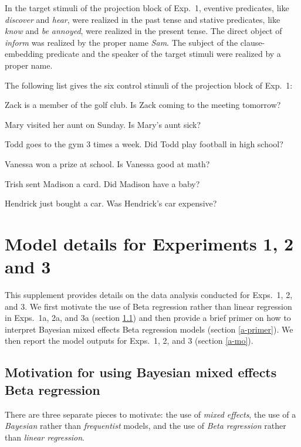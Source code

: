 \documentclass[11pt,fleqn]{article}
\newcommand{\6}{\mbox{$[\hspace*{-.6mm}[$}}
\newcommand{\9}{\mbox{$]\hspace*{-.6mm}]$}}
\begin{document}
In the target stimuli of the projection block of Exp.~1, eventive predicates, like {\em discover} and {\em hear}, were realized in the past tense and stative predicates, like {\em know} and {\em be annoyed}, were realized in the present tense. The direct object of {\em inform} was realized by the proper name {\em Sam}. The subject of the clause-embedding predicate and the speaker of the target stimuli were realized by a proper name. 

\bigskip
\noindent
The following list gives the six control stimuli of the projection block of Exp.~1: 

\begin{enumerate}[leftmargin=3ex,itemsep=-2pt]
  Zack is a member of the golf club. Is Zack coming to the meeting tomorrow?

 Mary visited her aunt on Sunday. Is Mary's aunt sick?

 Todd goes to the gym 3 times a week. Did Todd play football in high school?

 Vanessa won a prize at school. Is Vanessa good at math?

 Trish sent Madison a card. Did Madison have a baby?

 Hendrick just bought a car. Was Hendrick's car expensive?
\end{enumerate}

\section{Model details for Experiments 1, 2 and 3}\label{modeldetails}

This supplement provides details on the data analysis conducted for Exps.~1, 2, and 3. We first motivate the use of Beta regression rather than linear regression in Exps.~1a, 2a, and 3a (section \ref{a-motivation}) and then provide a brief primer on how to interpret Bayesian mixed effects Beta regression models (section \ref{a-primer}). We then report the model outputs for Exps.~1, 2, and 3 (section \ref{a-mo}).

\subsection{Motivation for using Bayesian mixed effects Beta regression}\label{a-motivation}

There are three separate pieces to motivate: the use of \emph{mixed effects}, the use of a \emph{Bayesian} rather than \emph{frequentist} models, and the use of \emph{Beta regression} rather than \emph{linear regression}. 
\end{document}
